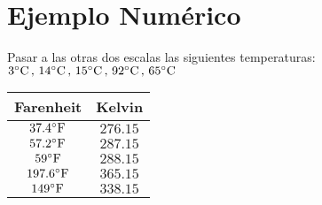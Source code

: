 \section{Ejemplo Numérico}

Pasar a las otras dos escalas las siguientes temperaturas:
$3\degree\,,\,14\degree\,,\,15\degree\,,\,92\degree\,,\,65\degree$

\begin{center}
    \begin{tabular}{c|c}
        Farenheit           & Kelvin\\
        \hline
        $37.4\degree[F]$    & $276.15$\\
        $57.2\degree[F]$    & $287.15$\\
        $59\degree[F]$      & $288.15$\\
        $197.6\degree[F]$   & $365.15$\\
        $149\degree[F]$     & $338.15$
    \end{tabular}
\end{center}